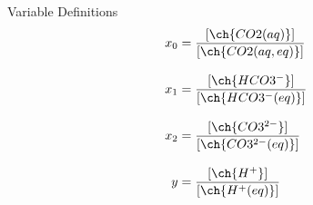\begin{block}{Variable Definitions}
\begin{align*}
x_0 &= \frac{[\ch{CO2(aq)}]}{[\ch{CO2(aq, eq)}]} \\[0.3cm]
x_1 &= \frac{[\ch{HCO3^-}]}{[\ch{HCO3^-(eq)}]} \\[0.3cm]
x_2 &= \frac{[\ch{CO3^{2-}}]}{[\ch{CO3^{2-}(eq)}]} \\[0.3cm]
y &= \frac{[\ch{H^+}]}{[\ch{H^+(eq)}]}
\end{align*}
\end{block}
